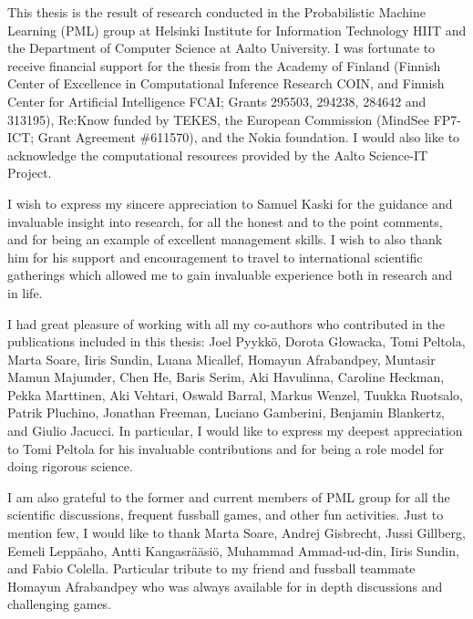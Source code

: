 \documentclass[dissertation,math,vertlayout,pdfa,colorlinks]{aaltoseries}
\begin{document}
\begin{preface}[Espoo]



This thesis is the result of research conducted in the Probabilistic Machine Learning (PML) group at Helsinki Institute for Information Technology HIIT and the Department of Computer Science at Aalto University. I was fortunate to receive financial support for the thesis from the Academy of Finland (Finnish Center of Excellence in Computational Inference Research COIN, and Finnish Center for Artificial Intelligence FCAI; Grants 295503, 294238, 284642 and 313195), Re:Know funded by TEKES, the European Commission (MindSee FP7-ICT; Grant Agreement \#611570), and the Nokia foundation. I would also like to acknowledge the computational resources provided by the Aalto Science-IT Project.

I wish to express my sincere appreciation to Samuel Kaski for the guidance and invaluable insight into research, for all the honest %
and to the point comments, and for being an example of excellent management skills. I wish to also thank him for his support and encouragement to travel to international scientific gatherings which allowed me to gain invaluable experience both in research and in life.

I had great pleasure of working with all my co-authors who contributed in the publications included in this thesis: Joel Pyykk\"o, Dorota G\l{}owacka, Tomi Peltola, Marta Soare, Iiris Sundin, Luana Micallef, Homayun Afrabandpey, Muntasir Mamun Majumder, Chen He, Baris Serim, Aki Havulinna, Caroline Heckman, Pekka Marttinen, Aki Vehtari, Oswald Barral, Markus Wenzel, Tuukka Ruotsalo, Patrik Pluchino, Jonathan Freeman, Luciano Gamberini, Benjamin Blankertz, and Giulio Jacucci. %
In particular, I would like to express my deepest appreciation to Tomi Peltola for his invaluable contributions and for being a role model for doing rigorous science. %

I am also grateful to the former and current members of PML group for all the scientific discussions, frequent fussball games, and other fun activities. Just to mention few, I would like to thank Marta Soare, Andrej Gisbrecht, Jussi Gillberg, Eemeli Leppäaho, Antti Kangasrääsiö, Muhammad Ammad-ud-din, Iiris Sundin, and Fabio Colella. Particular tribute to my friend and fussball teammate Homayun Afrabandpey who was always available for in depth discussions and challenging games. 


\end{preface}
\end{document}
